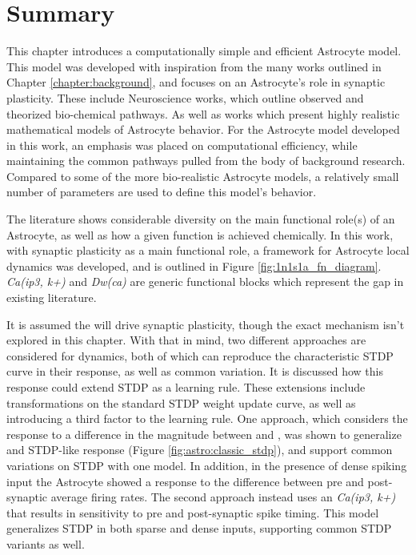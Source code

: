 
\section{Summary}

This chapter introduces a computationally simple and efficient Astrocyte
model. This model was developed with inspiration from the many works outlined in
Chapter \ref{chapter:background}, and focuses on an Astrocyte's role in synaptic
plasticity. These include Neuroscience works, which outline observed and
theorized bio-chemical pathways. As well as works which present highly realistic
mathematical models of Astrocyte behavior. For the Astrocyte model developed in
this work, an emphasis was placed on computational efficiency, while maintaining
the common pathways pulled from the body of background research. Compared to
some of the more bio-realistic Astrocyte models, a relatively small number of
parameters are used to define this model's behavior.

The literature shows considerable diversity on the main functional role(s) of an
Astrocyte, as well as how a given function is achieved chemically. In this work,
with synaptic plasticity as a main functional role, a framework for Astrocyte
local dynamics was developed, and is outlined in Figure
\ref{fig:1n1s1a_fn_diagram}. \emph{Ca(ip3, k+)} and \emph{Dw(ca)} are generic
functional blocks which represent the gap in existing literature.

It is assumed the \ca will drive synaptic plasticity, though the exact mechanism
isn't explored in this chapter. With that in mind, two different approaches are
considered for \ca dynamics, both of which can reproduce the characteristic
STDP curve in their \ca response, as well as common variation. It is discussed
how this \ca response could extend STDP as a learning rule. These
extensions include transformations on the standard STDP weight update curve, as
well as introducing a third factor to the learning rule. One approach, which
considers the \ca response to a difference in the magnitude between \ipt and
\kp, was shown to generalize and STDP-like response (Figure
\ref{fig:astro:classic_stdp}), and support common variations on
STDP with one model. In addition, in the presence of dense spiking input the
Astrocyte showed a response to the difference between pre and post-synaptic
average firing rates. The second approach instead uses an \emph{Ca(ip3, k+)} that
results in sensitivity to pre and post-synaptic spike timing. This model
generalizes STDP in both sparse and dense inputs, supporting common STDP
variants as well.

